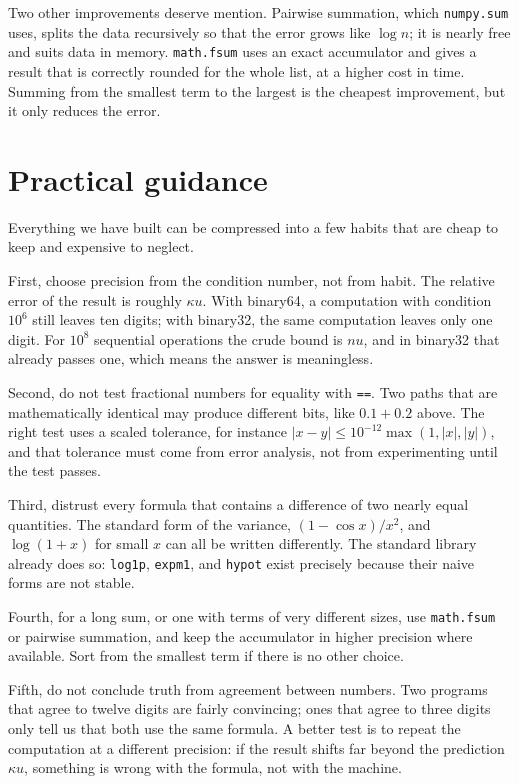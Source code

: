 Two other improvements deserve mention. Pairwise summation, which
\texttt{numpy.sum} uses, splits the data recursively
so that the error grows like $\log n$; it is nearly free and suits data in
memory. \texttt{math.fsum} uses an exact accumulator and gives a result that is correctly
rounded for the whole list, at a higher cost in time. Summing from the smallest term to
the largest is the cheapest improvement, but it only reduces the error.

\section{Practical guidance}

Everything we have built can be compressed into a few habits that are cheap to
keep and expensive to neglect.

First, choose precision from the condition number, not from habit.
The relative error of the result is roughly $\kappa u$. With binary64, a computation
with condition $10^{6}$ still leaves ten digits; with binary32, the same computation
leaves only one digit. For $10^{8}$ sequential operations the crude bound is
$nu$, and in binary32 that already passes one, which means the answer is meaningless.

Second, do not test fractional numbers for equality with \texttt{==}. Two paths that
are mathematically identical may produce different bits, like
$0.1+0.2$ above. The right test uses a scaled tolerance, for instance
$|x-y|\le10^{-12}\max(1,|x|,|y|)$, and that tolerance must come from error
analysis, not from experimenting until the test passes.

Third, distrust every formula that contains a difference of two nearly equal quantities.
The standard form of the variance, $(1-\cos x)/x^{2}$, and $\log(1+x)$ for small $x$ can
all be written differently. The standard library already does so: \texttt{log1p},
\texttt{expm1}, and \texttt{hypot} exist precisely because their naive forms are not
stable.

Fourth, for a long sum, or one with terms of very different sizes, use
\texttt{math.fsum} or pairwise summation, and keep the accumulator in higher precision
where available. Sort from the smallest term if there is no other choice.

Fifth, do not conclude truth from agreement between numbers. Two programs that agree
to twelve digits are fairly convincing; ones that agree to three digits only tell
us that both use the same formula. A better test is to repeat the computation at a
different precision: if the result shifts far beyond the prediction
$\kappa u$, something is wrong with the formula, not with the machine.


